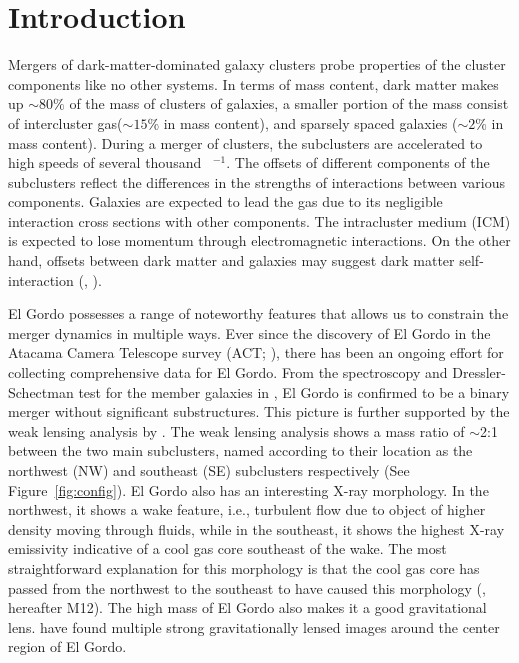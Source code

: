 \section{Introduction} 
Mergers of dark-matter-dominated galaxy clusters probe properties
of the cluster components like no other systems. 
In terms of mass content, dark matter makes up $\sim80\%$ of the mass of clusters
of galaxies, a smaller portion of the mass consist of intercluster
gas($\sim15\%$ in mass content), and sparsely spaced galaxies ($\sim2\%$ in mass content). During a merger of
clusters, the subclusters are accelerated to high speeds of several
thousand \kilo \meter~\second$^{-1}$. The offsets of
different components of the subclusters reflect the differences in the
strengths of interactions between various components. Galaxies are
expected to lead the gas due to its negligible interaction cross
sections with other components. The intracluster medium (ICM) is expected to lose
momentum through electromagnetic interactions. On the other hand, offsets
between dark matter and galaxies may suggest dark matter self-interaction
(\citealt{Kahlhoefer14}, \citealt{Randall2008d}).  
\par
El Gordo possesses a range of noteworthy features that allows us to constrain
the merger dynamics in multiple ways.  Ever since the discovery of El Gordo
in the Atacama Camera Telescope survey (ACT; \citealt{Marriage11}), there
has been an ongoing effort for
collecting comprehensive data for El Gordo.
From the spectroscopy and Dressler-Schectman test for the member galaxies
in \cite{Sifon13}, El Gordo is confirmed to be a binary merger 
without significant substructures. This picture is further supported by the
weak lensing analysis by \cite{Jee13}. The weak lensing analysis shows
a mass ratio of $\sim$2:1  between the two main subclusters, named
according to their location as the northwest (NW) and southeast (SE) subclusters respectively 
(See Figure~\ref{fig:config}). 
El Gordo also has an interesting X-ray morphology. In the northwest, it shows a wake feature, i.e.,
turbulent flow due to object of higher density moving through fluids, while
in the southeast, it shows the highest X-ray emissivity indicative of a
cool gas core southeast of the wake. The most straightforward explanation for this morphology is that the
cool gas core has passed from the northwest to the southeast
to have caused this morphology (\citealt{M12}, hereafter M12). 
The high mass of El Gordo also makes it a good
gravitational lens. \cite{Zitrin13} have found multiple strong
gravitationally lensed images around the center region of El Gordo. 

